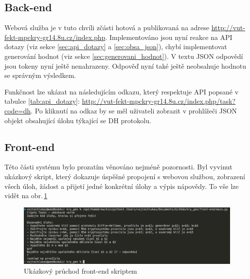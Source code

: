 \documentclass[titlepage]{article}
\begin{document}
\subsection{Back-end}
Webová služba je v tuto chvíli zčásti hotová a publikovaná na adrese \url{http://vut-fekt-mpckry-gr14.8u.cz/index.php}. Implementováno jsou nyní reakce na API dotazy (viz sekce \ref{sec:api_dotazy} a \ref{sec:obsa_json}), chybí implementovat generování hodnot (viz sekce \ref{sec:generovani_hodnot}). V textu JSON odpovědí jsou tokeny  nyní ještě nenahrazeny. Odpověď nyní také ještě neobsahuje hodnotu se správným výsledkem. 



Funkčnost lze ukázat na následujícím odkazu, který respektuje API popsané v tabulce \ref{tab:api_dotazy}:
\url{http://vut-fekt-mpckry-gr14.8u.cz/index.php/task?code=dh}.
Po kliknutí na odkaz by se měl uživateli zobrazit v prohlížeči JSON objekt obsahující úlohu týkající se DH protokolu. 

\subsection{Front-end}
Této části systému bylo prozatím věnováno nejméně pozornosti. Byl vyvinut ukázkový skript, který dokazuje úspěšné propojení s webovou službou, zobrazení všech úloh, žádost a přijetí jedné konkrétní úlohy a výpis nápovědy. To vše lze vidět na obr.\,\ref{fig:front_end}

\begin{figure}
    \centering
    \includegraphics[width=.8\linewidth]{frontend.png}
    \caption{Ukázkový průchod front-end skriptem}
    \label{fig:front_end}
\end{figure}
\end{document}
